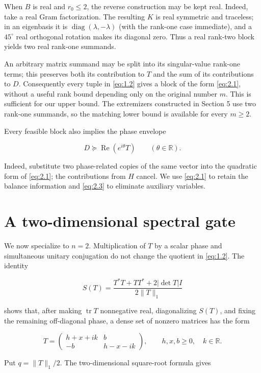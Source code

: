 \documentclass[11pt]{article}
\begin{document}
When $B$ is real and $r_0\le2$, the reverse construction may be kept real.
Indeed, take a real Gram factorization. The resulting $K$ is real symmetric and
traceless; in an eigenbasis it is $\operatorname{diag}(\lambda,-\lambda)$ (with
the rank-one case immediate), and a $45^\circ$ real orthogonal rotation makes
its diagonal zero. Thus a real rank-two block yields two real rank-one
summands.

An arbitrary matrix summand may be split into its singular-value rank-one terms;
this preserves both its contribution to $T$ and the sum of its contributions to
$D$. Consequently every tuple in \eqref{eq:1.2} gives a block of the form \eqref{eq:2.1}, without
a useful rank bound depending only on the original number $m$. This is sufficient
for our upper bound. The extremizers constructed in Section 5 use two rank-one
summands, so the matching lower bound is available for every $m\ge2$.

Every feasible block also implies the phase envelope

\[
D\succeq\operatorname{Re}(e^{i\theta}T)
\qquad(\theta\in\mathbb R).
\tag{2.3}\label{eq:2.3}
\]

Indeed, substitute two phase-related copies of the same vector into the quadratic
form of \eqref{eq:2.1}; the contributions from $H$ cancel. We use \eqref{eq:2.1} to retain the
balance information and \eqref{eq:2.3} to eliminate auxiliary variables.

\section{A two-dimensional spectral gate}


We now specialize to $n=2$. Multiplication of $T$ by a scalar phase and simultaneous
unitary conjugation do not change the quotient in \eqref{eq:1.2}. The identity

\[
S(T)=\frac{T^*T+TT^*+2|\det T|I}{2\|T\|_1}
\]

shows that, after making $\operatorname{tr}T$ nonnegative real, diagonalizing
$S(T)$, and fixing the remaining off-diagonal phase, a dense set of nonzero
matrices has the form

\[
T=\begin{pmatrix}
h+x+ik&b\\-b&h-x-ik
\end{pmatrix},
\qquad h,x,b\ge0,\quad k\in\mathbb R.
\tag{3.1}\label{eq:3.1}
\]

Put $q=\|T\|_1/2$. The two-dimensional square-root formula gives
\end{document}
